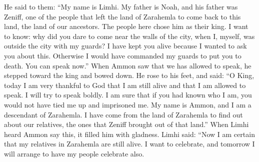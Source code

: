 He said to them: ``My name is Limhi. My father is Noah, and his father was Zeniff, one of the people that left the land of Zarahemla to come back to this land, the land of our ancestors. The people here chose him as their king.
\bverse \iffalse And now, I desire to know the cause whereby ye were so bold as to come near the walls of the city, when I, myself, was with my guards without the gate? \fi
I want to know: why did you dare to come near the walls of the city, when I, myself, was outside the city with my guards?
\bverse \iffalse And now, for this cause have I suffered that ye should be preserved, that I might inquire of you, or else I should have caused that my guards should have put you to death. Ye are permitted to speak. \fi
I have kept you alive because I wanted to ask you about this. Otherwise I would have commanded my guards to put you to death. You can speak now.''
\bverse \iffalse And now, when Ammon saw that he was permitted to speak, he went forth and bowed himself before the king; and rising again he said: O king, I am very thankful before God this day that I am yet alive, and am permitted to speak; and I will endeavor to speak with boldness; \fi
When Ammon saw that we has allowed to speak, he stepped toward the king and bowed down. He rose to his feet, and said: ``O King, today I am very thankful to God that I am still alive and that I am allowed to speak. I will try to speak boldly.
\bverse \iffalse For I am assured that if ye had known me ye would not have suffered that I should have worn these bands. For I am Ammon, and am a descendant of Zarahemla, and have come up out of the land of Zarahemla to inquire concerning our brethren, whom Zeniff brought up out of that land. \fi
I am sure that if you had known who I am, you would not have tied me up and imprisoned me. My name is Ammon, and I am a descendant of Zarahemla. I have come from the land of Zarahemla to find out about our relatives, the ones that Zeniff brought out of that land.''
\bverse \iffalse And now, it came to pass that after Limhi had heard the words of Ammon, he was exceedingly glad, and said: Now, I know of a surety that my brethren who were in the land of Zarahemla are yet alive. And now, I will rejoice; and on the morrow I will cause that my people shall rejoice also. \fi
When Limhi heard Ammon say this, it filled him with gladness. Limhi said: ``Now I am certain that my relatives in Zarahemla are still alive. I want to celebrate, and tomorrow I will arrange to have my people celebrate also.
